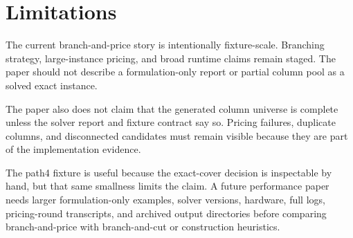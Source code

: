 \section{Limitations}

The current branch-and-price story is intentionally fixture-scale. Branching
strategy, large-instance pricing, and broad runtime claims remain staged. The
paper should not describe a formulation-only report or partial column pool as a
solved exact instance.

The paper also does not claim that the generated column universe is complete
unless the solver report and fixture contract say so. Pricing failures,
duplicate columns, and disconnected candidates must remain visible because they
are part of the implementation evidence.

The path4 fixture is useful because the exact-cover decision is inspectable by
hand, but that same smallness limits the claim. A future performance paper
needs larger formulation-only examples, solver versions, hardware, full logs,
pricing-round transcripts, and archived output directories before comparing
branch-and-price with branch-and-cut or construction heuristics.
